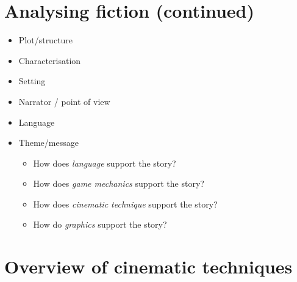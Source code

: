 \documentclass[11pt,a4paper,oneside]{book}
\begin{document}
\section*{Analysing fiction (continued)}

\begin{itemize}
\item Plot/structure


\item Characterisation


\item Setting


\item Narrator / point of view


\item Language


\item Theme/message


\begin{itemize}
\item How does \emph{language} support the story?
\item How does \emph{game mechanics} support the story?
\item How does \emph{cinematic technique} support the story?
\item How do \emph{graphics} support the story?
\end{itemize}

\end{itemize}

\section*{Overview of cinematic techniques}
\end{document}
